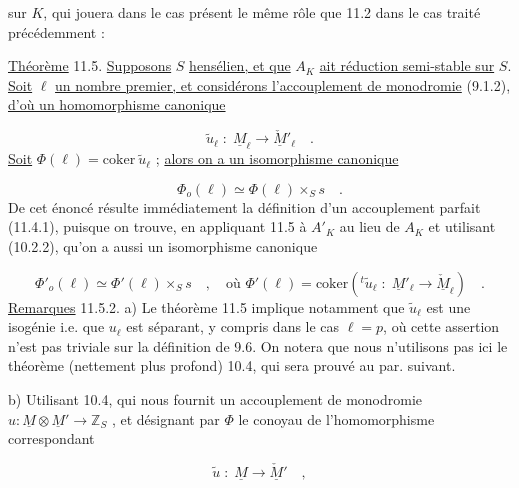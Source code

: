 
sur $K$, qui jouera dans le cas présent le même rôle que 11.2 dans le cas traité précédemment :

\underline{Théorème} 11.5. \underline{Supposons} $S$ \underline{hensélien, et que} $A_K$ \underline{ait réduction semi-stable sur} $S$. \underline{Soit} $\ell$ \underline{un nombre premier, et considérons l'accouplement de monodromie} (9.1.2), \underline{d'où un homomorphisme canonique}

\begin{equation*}
\widetilde{u}_{\ell} \; : \; \underline{M}_{\ell} \longrightarrow \underline{\check{M}}'_{\ell} \quad .
\end{equation*}
\underline{Soit} $\Phi(\ell) = \mathrm{coker}\ \widetilde{u}_{\ell}$ ; \underline{alors on a un isomorphisme canonique}

\begin{equation}\tag{11.5.1}
\Phi_o(\ell) \simeq \Phi(\ell)\times_S s \quad .
\end{equation}
De cet énoncé résulte immédiatement la définition d'un accouplement parfait (11.4.1), puisque on trouve, en appliquant 11.5 à $A'_K$ au lieu de $A_K$ et utilisant (10.2.2), qu'on a aussi un isomorphisme canonique

\begin{equation*}
\Phi'_o(\ell) \simeq \Phi'(\ell)\times_S s \quad , \quad \text{où } \Phi'(\ell) = \mathrm{coker}({}^t\widetilde{u}_{\ell} \; : \; \underline{M}'_{\ell} \longrightarrow \underline{\check{M}}_{\ell}) \quad .
\end{equation*}
\underline{Remarques} 11.5.2. a) Le théorème 11.5 implique notamment que $\widetilde{u}_{\ell}$ est une isogénie i.e. que $u_{\ell}$ est séparant, y compris dans le cas $\ell = p$, où cette assertion n'est pas triviale sur la définition de 9.6. On notera que nous n'utilisons pas ici le théorème (nettement plus profond) 10.4, qui sera prouvé au par. suivant.

b) Utilisant 10.4, qui nous fournit un accouplement de monodromie $u: \underline{M} \otimes \underline{M}' \longrightarrow \mathbb{Z}_S$ , et désignant par $\Phi$ le conoyau de l'homomorphisme correspondant

\begin{equation*}
\widetilde{u} \; : \; \underline{M} \longrightarrow \underline{\check{M}}' \quad ,
\end{equation*}


